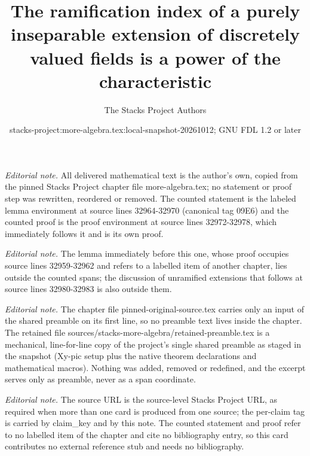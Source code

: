 \documentclass[10pt,a4paper]{amsart}
\title{The ramification index of a purely inseparable extension of discretely valued fields is a power of the characteristic}
\author{The Stacks Project Authors}
\date{stacks-project:more-algebra.tex:local-snapshot-20261012; GNU FDL 1.2 or later}
\theoremstyle{plain}
\theoremstyle{definition}
\theoremstyle{remark}
\numberwithin{equation}{subsection}
\begin{document}
\maketitle
\setcounter{subsection}{1}
\noindent\textit{Editorial note.} All delivered mathematical text is the author's own, copied from the pinned Stacks Project chapter file more-algebra.tex; no statement or proof step was rewritten, reordered or removed. The counted statement is the labeled lemma environment at source lines 32964-32970 (canonical tag 09E6) and the counted proof is the proof environment at source lines 32972-32978, which immediately follows it and is its own proof.\par\medskip
\noindent\textit{Editorial note.} The lemma immediately before this one, whose proof occupies source lines 32959-32962 and refers to a labelled item of another chapter, lies outside the counted spans; the discussion of unramified extensions that follows at source lines 32980-32983 is also outside them.\par\medskip
\noindent\textit{Editorial note.} The chapter file pinned-original-source.tex carries only an input of the shared preamble on its first line, so no preamble text lives inside the chapter. The retained file sources/stacks-more-algebra/retained-preamble.tex is a mechanical, line-for-line copy of the project's single shared preamble as staged in the snapshot (Xy-pic setup plus the native theorem declarations and mathematical macros). Nothing was added, removed or redefined, and the excerpt serves only as preamble, never as a span coordinate.\par\medskip
\noindent\textit{Editorial note.} The source URL is the source-level Stacks Project URL, as required when more than one card is produced from one source; the per-claim tag is carried by claim\_key and by this note. The counted statement and proof refer to no labelled item of the chapter and cite no bibliography entry, so this card contributes no external reference stub and needs no bibliography.\par\medskip
\end{document}
